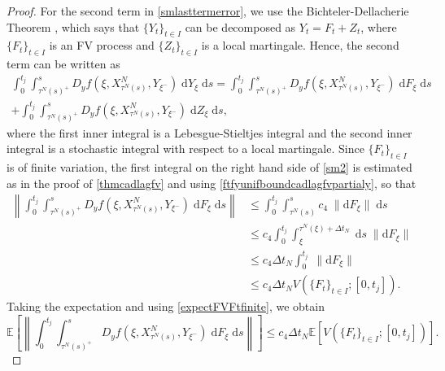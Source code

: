 \documentclass[reqno,12pt]{amsart}
\theoremstyle{plain} %
\theoremstyle{definition} %
\begin{document}
\begin{proof}
    For the second term in \eqref{smlasttermerror}, we use the Bichteler-Dellacherie Theorem \cite[Theorem III.47]{Protter2005}, which says that $\{Y_t\}_{t\in I}$ can be decomposed as $Y_t = F_t + Z_t$, where $\{F_t\}_{t\in I}$ is an FV process and $\{Z_t\}_{t\in I}$ is a local martingale. Hence, the second term can be written as
    \begin{multline}
        \label{sm2}
        \int_0^{t_j} \int_{\tau^N(s)^+}^s D_y f(\xi, X_{\tau^N(s)}^N, Y_{\xi^-}) \;\mathrm{d}Y_\xi \;\mathrm{d}s = \int_0^{t_j} \int_{\tau^N(s)^+}^s D_y f(\xi, X_{\tau^N(s)}^N, Y_{\xi^-}) \;\mathrm{d}F_\xi \;\mathrm{d}s \\  
        + \int_0^{t_j} \int_{\tau^N(s)^+}^s D_y f(\xi, X_{\tau^N(s)}^N, Y_{\xi^-}) \;\mathrm{d}Z_\xi \;\mathrm{d}s,
    \end{multline}
    where the first inner integral is a Lebesgue-Stieltjes integral and the second inner integral is a stochastic integral with respect to a local martingale. Since $\{F_t\}_{t\in I}$ is of finite variation, the first integral on the right hand side of \eqref{sm2} is estimated as in the proof of \cref{thmcadlagfv} and using \eqref{ftfyunifboundcadlagfvpartialy}, so that
    \begin{align*}
        \left\|\int_0^{t_j} \int_{\tau^N(s)^+}^s D_y f(\xi, X_{\tau^N(s)}^N, Y_{\xi^-}) \;\mathrm{d}F_\xi\;\mathrm{d}s\right\| & \leq \int_0^{t_j} \int_{\tau^N(s)}^s c_4\;\|\mathrm{d}F_\xi\|\;\mathrm{d}s \\
        & \leq c_4\int_0^{t_j} \int_{\xi}^{\tau^N(\xi) + \Delta t_N} \;\mathrm{d}s\;\|\mathrm{d}F_\xi\| \\
        & \leq c_4\Delta t_N\int_0^{t_j} \;\|\mathrm{d}F_\xi\| \\
        & \leq c_4\Delta t_N V(\{F_t\}_{t\in I}; [0, t_j]).
    \end{align*}
    Taking the expectation and using \eqref{expectFVFtfinite}, we obtain
    \begin{equation*}
        \mathbb{E}\left[\left\|\int_0^{t_j} \int_{\tau^N(s)^+}^s D_y f(\xi, X_{\tau^N(s)}^N, Y_{\xi^-}) \;\mathrm{d}F_\xi\;\mathrm{d}s\right\|\right] \leq c_4 \Delta t_N \mathbb{E}\left[ V(\{F_t\}_{t\in I}; [0, t_j]) \right].
    \end{equation*}
    

\end{proof}
\end{document}
